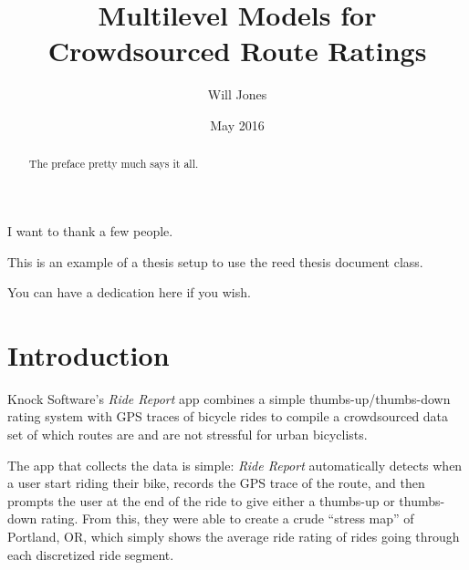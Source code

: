 \documentclass[12pt,twoside]{reedthesis}
\title{Multilevel Models for Crowdsourced Route Ratings}
\author{Will Jones}
\date{May 2016}
\begin{document}
      \maketitle
  
  \frontmatter %
  \pagestyle{empty} %

      \begin{acknowledgements}
      I want to thank a few people.
    \end{acknowledgements}
  
      \begin{preface}
      This is an example of a thesis setup to use the reed thesis document
      class.
    \end{preface}
  

      \hypersetup{linkcolor=black}
    \setcounter{tocdepth}{2}
    \tableofcontents
  
      \listoftables
  
      \listoffigures
  
      \begin{abstract}
      The preface pretty much says it all.
    \end{abstract}
  
      \begin{dedication}
      You can have a dedication here if you wish.
    \end{dedication}
  
  \mainmatter %
  \pagestyle{fancyplain} %

  \chapter*{Introduction}\label{introduction}
  
  Knock Software's \emph{Ride Report} app combines a simple
  thumbs-up/thumbs-down rating system with GPS traces of bicycle rides to
  compile a crowdsourced data set of which routes are and are not
  stressful for urban bicyclists.
  
  The app that collects the data is simple: \emph{Ride Report}
  automatically detects when a user start riding their bike, records the
  GPS trace of the route, and then prompts the user at the end of the ride
  to give either a thumbs-up or thumbs-down rating. From this, they were
  able to create a crude ``stress map'' of Portland, OR, which simply
  shows the average ride rating of rides going through each discretized
  ride segment.
  
\end{document}
